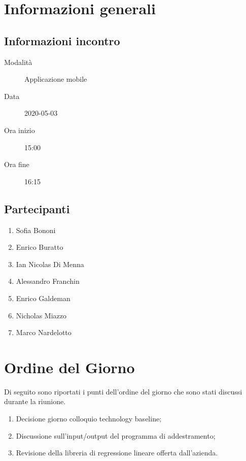 \documentclass{article}
\begin{document}


\section{Informazioni generali}%
\label{sec:informazioni_generali}

\subsection{Informazioni incontro}%
\label{sub:informazioni_incontro}

\begin{description}
  \item[Modalità] Applicazione mobile 
  \item[Data] 2020-05-03
  \item[Ora inizio] 15:00
  \item[Ora fine] 16:15
\end{description}

\subsection{Partecipanti}%
\label{sub:partecipanti}

\begin{enumerate}
  \item Sofia Bononi
  \item Enrico Buratto
  \item Ian Nicolas Di Menna
  \item Alessandro Franchin
  \item Enrico Galdeman
  \item Nicholas Miazzo
  \item Marco Nardelotto
\end{enumerate}

\section{Ordine del Giorno}%
\label{ordine_del_giorno}
Di seguito sono riportati i punti dell'ordine del giorno che sono stati discussi durante la riunione.
\begin{enumerate}
  \item Decisione giorno colloquio technology baseline;
  \item Discussione sull'input/output del programma di addestramento;
  \item Revisione della libreria di regressione lineare offerta dall'azienda.
\end{enumerate}
\end{document}
